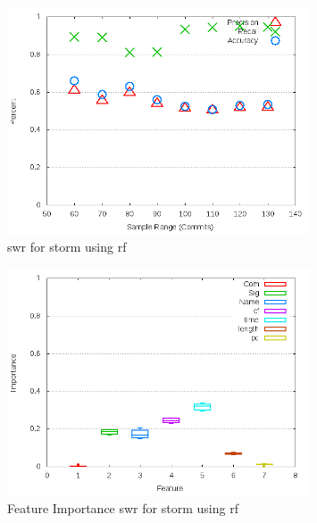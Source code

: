 \begin{figure}[!t]
\centering
\includegraphics[width=0.8\textwidth]{images/rf/test_1/storm_sample_range.png}
\caption{\gls{swr} for storm using \gls{rf}}
\label{fig:test_1_storm_rf}
\end{figure}

\begin{figure}[!t]
\centering
\includegraphics[width=0.8\textwidth]{images/rf/test_1/storm_importance.png}
\caption{Feature Importance \gls{swr} for storm using \gls{rf}}
\label{fig:test_1_storm_rf_importance}
\end{figure}

